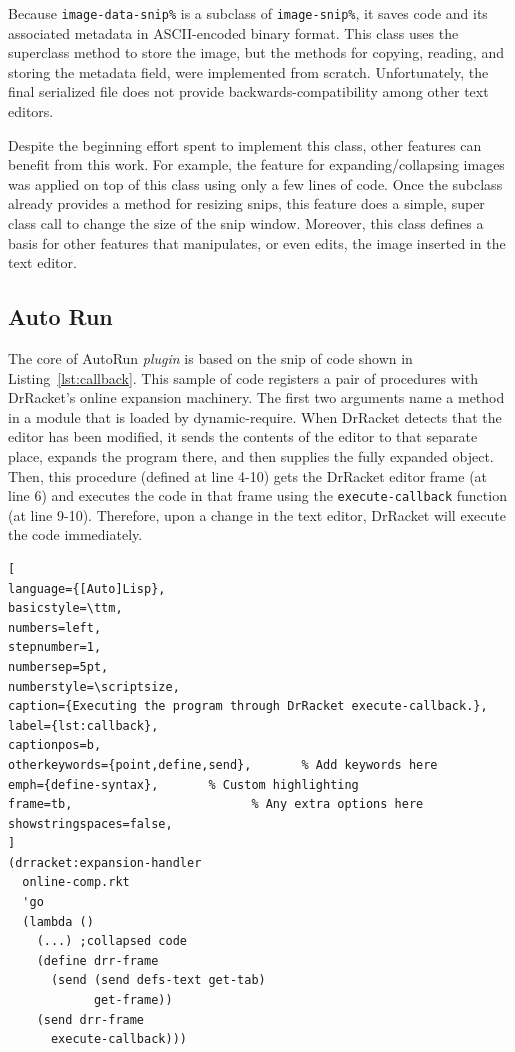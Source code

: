 Because \texttt{image-data-snip\%} is a subclass of \texttt{image-snip\%}, it saves code and its associated metadata in ASCII-encoded binary format. This class uses the superclass method to store the image, but the methods for copying, reading, and storing the metadata field, were implemented from scratch. Unfortunately, the final serialized file does not provide backwards-compatibility among other text editors.

Despite the beginning effort spent to implement this class, other features can benefit from this work. For example, the feature for expanding/collapsing images was applied on top of this class using only a few lines of code. Once the subclass already provides a method for resizing snips, this feature does a simple, super class call to change the size of the snip window. Moreover, this class defines a basis for other features that manipulates, or even edits, the image inserted in the text editor. 

\subsection{Auto Run}

The core of AutoRun \textit{plugin} is based on the snip of code shown in Listing~\ref{lst:callback}. This sample of code registers a pair of procedures with DrRacket’s online expansion machinery. The first two arguments name a method in a module that is loaded by dynamic-require. When DrRacket detects that the editor has been modified, it sends the contents of the editor to that separate place, expands the program there, and then supplies the fully expanded object. Then, this procedure (defined at line 4-10) gets the DrRacket editor frame (at line 6) and executes the code in that frame using the \texttt{execute-callback} function (at line 9-10). Therefore, upon a change in the text editor, DrRacket will execute the code immediately. 

\begin{lstlisting}[
language={[Auto]Lisp},
basicstyle=\ttm,
numbers=left,
stepnumber=1,
numbersep=5pt,                   
numberstyle=\scriptsize, 
caption={Executing the program through DrRacket execute-callback.},
label={lst:callback},
captionpos=b, 
otherkeywords={point,define,send},       % Add keywords here
emph={define-syntax},       % Custom highlighting
frame=tb,                         % Any extra options here
showstringspaces=false,
]
(drracket:expansion-handler
  online-comp.rkt
  'go
  (lambda ()
    (...) ;collapsed code
    (define drr-frame 
      (send (send defs-text get-tab) 
            get-frame))
    (send drr-frame 
      execute-callback)))
\end{lstlisting}

